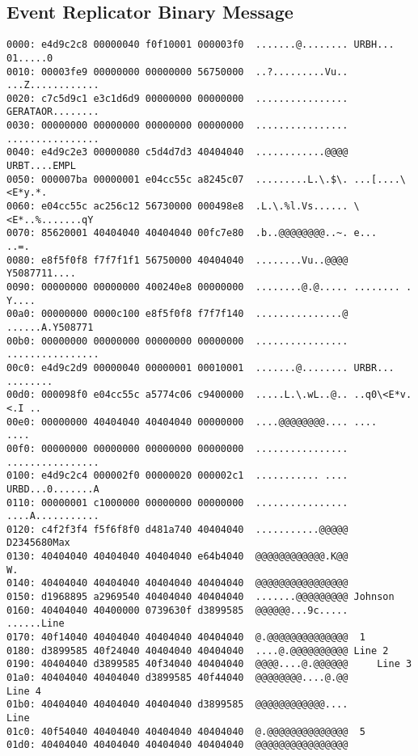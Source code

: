 \subsection{Event Replicator Binary Message}
\label{appendix01:binarymessageexample:binarymessage}
\begin{verbatim}
0000: e4d9c2c8 00000040 f0f10001 000003f0  .......@........ URBH... 01.....0
0010: 00003fe9 00000000 00000000 56750000  ..?.........Vu.. ...Z............
0020: c7c5d9c1 e3c1d6d9 00000000 00000000  ................ GERATAOR........
0030: 00000000 00000000 00000000 00000000  ................ ................
0040: e4d9c2e3 00000080 c5d4d7d3 40404040  ............@@@@ URBT....EMPL    
0050: 000007ba 00000001 e04cc55c a8245c07  .........L.\.$\. ...[....\<E*y.*.
0060: e04cc55c ac256c12 56730000 000498e8  .L.\.%l.Vs...... \<E*..%.......qY
0070: 85620001 40404040 40404040 00fc7e80  .b..@@@@@@@@..~. e...        ..=.
0080: e8f5f0f8 f7f7f1f1 56750000 40404040  ........Vu..@@@@ Y5087711....    
0090: 00000000 00000000 400240e8 00000000  ........@.@..... ........ . Y....
00a0: 00000000 0000c100 e8f5f0f8 f7f7f140  ...............@ ......A.Y508771 
00b0: 00000000 00000000 00000000 00000000  ................ ................
00c0: e4d9c2d9 00000040 00000001 00010001  .......@........ URBR... ........
00d0: 000098f0 e04cc55c a5774c06 c9400000  .....L.\.wL..@.. ..q0\<E*v.<.I ..
00e0: 00000000 40404040 40404040 00000000  ....@@@@@@@@.... ....        ....
00f0: 00000000 00000000 00000000 00000000  ................ ................
0100: e4d9c2c4 000002f0 00000020 000002c1  ........... .... URBD...0.......A
0110: 00000001 c1000000 00000000 00000000  ................ ....A...........
0120: c4f2f3f4 f5f6f8f0 d481a740 40404040  ...........@@@@@ D2345680Max     
0130: 40404040 40404040 40404040 e64b4040  @@@@@@@@@@@@.K@@             W.  
0140: 40404040 40404040 40404040 40404040  @@@@@@@@@@@@@@@@                 
0150: d1968895 a2969540 40404040 40404040  .......@@@@@@@@@ Johnson         
0160: 40404040 40400000 0739630f d3899585  @@@@@@...9c.....       ......Line
0170: 40f14040 40404040 40404040 40404040  @.@@@@@@@@@@@@@@  1              
0180: d3899585 40f24040 40404040 40404040  ....@.@@@@@@@@@@ Line 2          
0190: 40404040 d3899585 40f34040 40404040  @@@@....@.@@@@@@     Line 3      
01a0: 40404040 40404040 d3899585 40f44040  @@@@@@@@....@.@@         Line 4  
01b0: 40404040 40404040 40404040 d3899585  @@@@@@@@@@@@....             Line
01c0: 40f54040 40404040 40404040 40404040  @.@@@@@@@@@@@@@@  5              
01d0: 40404040 40404040 40404040 40404040  @@@@@@@@@@@@@@@@                 

\end{verbatim}
